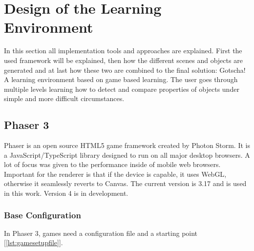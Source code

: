 
\chapter{Design of the Learning Environment}\label{ch:design}

In this section all implementation tools and approaches are explained.
First the used framework will be explained, then how the different scenes and objects are generated and
at last how these two are combined to the final solution: Gotscha! A learning environment based on game based learning.
The user goes through multiple levels learning how to detect and compare properties of objects
under simple and more difficult circumstances.

\section{Phaser 3}\label{sec:phaser-3}

Phaser\cite{phaser} is an open source HTML5\cite{html5} game framework created by Photon Storm\cite{phaser}.
It is a JavaScript/TypeScript\cite{typescript} library designed to run on all major desktop browsers.
A lot of focus was given to the performance inside of mobile web browsers.
Important for the renderer is that if the device is capable, it uses WebGL\cite{webgl}, otherwise it seamlessly reverts to Canvas\cite{canvas}.
The current version is 3.17 and is used in this work. Version 4 is in development.

\subsection{Base Configuration}\label{subsec:base-configuration}
In Phaser 3, games need a configuration file and a starting point [\ref{lst:gamesetupfile}].

